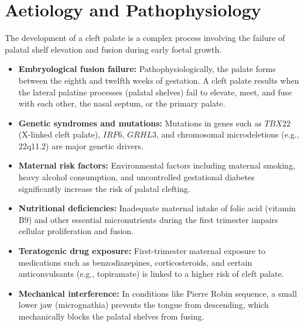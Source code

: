 \section*{Aetiology and Pathophysiology}
The development of a cleft palate is a complex process involving the failure of palatal shelf elevation and fusion during early foetal growth.
\begin{itemize}
    \item \textbf{Embryological fusion failure:} Pathophysiologically, the palate forms between the eighth and twelfth weeks of gestation. A cleft palate results when the lateral palatine processes (palatal shelves) fail to elevate, meet, and fuse with each other, the nasal septum, or the primary palate.
    \item \textbf{Genetic syndromes and mutations:} Mutations in genes such as $TBX22$ (X-linked cleft palate), $IRF6$, $GRHL3$, and chromosomal microdeletions (e.g., 22q11.2) are major genetic drivers.
    \item \textbf{Maternal risk factors:} Environmental factors including maternal smoking, heavy alcohol consumption, and uncontrolled gestational diabetes significantly increase the risk of palatal clefting.
    \item \textbf{Nutritional deficiencies:} Inadequate maternal intake of folic acid (vitamin B9) and other essential micronutrients during the first trimester impairs cellular proliferation and fusion.
    \item \textbf{Teratogenic drug exposure:} First-trimester maternal exposure to medications such as benzodiazepines, corticosteroids, and certain anticonvulsants (e.g., topiramate) is linked to a higher risk of cleft palate.
    \item \textbf{Mechanical interference:} In conditions like Pierre Robin sequence, a small lower jaw (micrognathia) prevents the tongue from descending, which mechanically blocks the palatal shelves from fusing.
\end{itemize}

